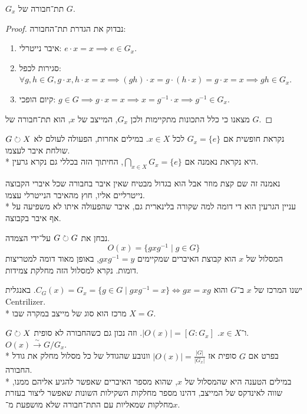 \begin{lemma}
	$G_x$ תת־חבורה של $G$.
\end{lemma}
\begin{proof}
	נבדוק את הגדרת תת־החבורה:
	\begin{enumerate}
		\item איבר נייטרלי: $e \cdot x = x \implies e \in G_x$.
		\item סגירות לכפל: $\forall g, h \in G, g \cdot x, h \cdot x = x \implies (gh) \cdot x = g \cdot (h \cdot x) = g \cdot x = x \implies gh \in G_x$.
		\item קיום הופכי: $g \in G \implies g \cdot x = x \implies x = g^{-1} \cdot x \implies g^{-1} \in G_x$.
	\end{enumerate}
	מצאנו כי כלל התכונות מתקיימות ולכן $G_x$, המייצב של $x$, הוא תת־חבורה של $G$.
\end{proof}
\begin{definition}
	$G \circlearrowright X$ נקראת חופשית אם $G_x = \{e\}$ לכל $x \in X$. במילים אחרות, הפעולה לעולם לא שולחת איבר לעצמו. \\*
	היא נקראת נאמנה אם $\bigcap_{x \in X} G_x = \{e\}$, החיתוך הזה בכללי גם נקרא גרעין.
\end{definition}
נאמנה זה שם קצת מוזר אבל הוא בגדול מבטיח שאין איבר בחבורה שכל איברי הקבוצה נייטרליים אליו, חוץ מהאיבר הנייטרלי עצמו. \\*
עניין הגרעין הוא די דומה למה שקורה בלינארית גם, איבר שהפעולה איתו לא משפיעה על אף איבר בקבוצה.
\begin{definition}
	נבחן את $G \circlearrowright G$ על־ידי הצמדה.
	\[
		O(x) = \{ g x g^{-1} \mid g \in G\}
	\]
	המסלול של $x$ הוא קבוצת האיברים שמקיימים $g x g^{-1} = y$, באופן מאוד דומה למטריצות דומות.
	נקרא למסלול הזה מחלקת צמידות.
\end{definition}
\begin{definition}[מרכז]
	ישנו המרכז של $x$ ב־$G$ והוא $C_G(x) = G_x = \{ g \in G \mid g x g^{-1} = x\} \iff gx = xg$. באנגלית Centrilizer.\\*
	מרכז הוא סוג של מייצב במקרה שבו $X = G$.
\end{definition}
\begin{theorem}
	$G \circlearrowright X$ ו־$x \in X$. $|O(x)| = [G : G_x]$. וזה נכון גם כשהחבורה לא סופית. $O(x) \xrightarrow{\sim} G/G_x$.\\*
	בפרט אם $G$ סופית אז $|O(x)| = \frac{|G|}{|G_x|}$ וונובע שהגודל של כל מסלול מחלק את גודל החבורה. \\*
	במילים הטענה היא שהמסלול של $x$, שהוא מספר האיברים שאפשר להגיע אליהם ממנו, שווה לאינדקס של המייצב, דהינו מספר מחלקות השקילות השונות שאפשר ליצור בעזרת מחלקות שמאליות עם התת־חבורה שלא מושפעת מ־$x$.
\end{theorem}
